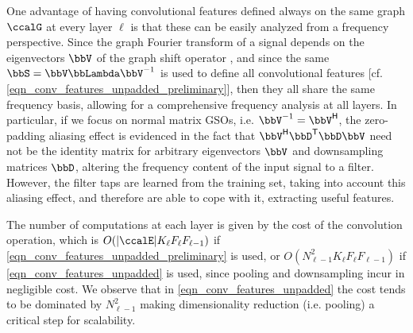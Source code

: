  One advantage of having convolutional features defined always on the same graph $\ccalG$ at every layer $\ell$ is that these can be easily analyzed from a frequency perspective. Since the graph Fourier transform of a signal depends on the eigenvectors $\bbV$ of the graph shift operator \cite{sandryhaila14-freq}, and since the same $\bbS = \bbV \bbLambda \bbV^{-1}$ is used to define all convolutional features [cf. \eqref {eqn_conv_features_unpadded_preliminary}], then they all share the same frequency basis, allowing for a comprehensive frequency analysis at all layers. In particular, if we focus on normal matrix GSOs, i.e. $\bbV^{-1} = \bbV^{\Hr}$, the zero-padding aliasing effect is evidenced in the fact that $\bbV^{\Hr} \bbD^{\Tr} \bbD \bbV$ need not be the identity matrix for arbitrary eigenvectors $\bbV$ and downsampling matrices $\bbD$, altering the frequency content of the input signal to a filter. However, the filter taps are learned from the training set, taking into account this aliasing effect, and therefore are able to cope with it, extracting useful features.

 The number of computations at each layer is given by the cost of the convolution operation, which is $O(|\ccalE|K_{\ell} F_{\ell} F_{\ell-1})$ if \eqref{eqn_conv_features_unpadded_preliminary} is used, or $O(N_{\ell-1}^{2} K_{\ell} F_{\ell} F_{\ell-1})$ if \eqref{eqn_conv_features_unpadded} is used, since pooling and downsampling incur in negligible cost. We observe that in \eqref{eqn_conv_features_unpadded} the cost tends to be dominated by $N_{\ell-1}^{2}$ making dimensionality reduction (i.e. pooling) a critical step for scalability.

